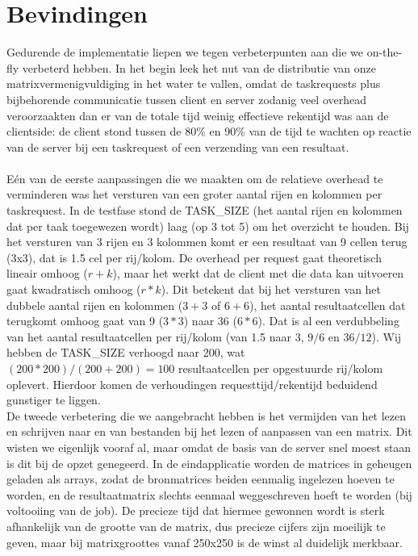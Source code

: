 \documentclass[11pt]{article}
\begin{document}
\section{Bevindingen}
Gedurende de implementatie liepen we tegen verbeterpunten aan die we on-the-fly verbeterd hebben.
In het begin leek het nut van de distributie van onze matrixvermenigvuldiging in het water te
vallen, omdat de taskrequests plus bijbehorende communicatie tussen client en server zodanig
veel overhead veroorzaakten dan er van de totale tijd weinig effectieve rekentijd was aan de 
clientside: de client stond tussen de 80\% en 90\% van de tijd te wachten op reactie van de
server bij een taskrequest of een verzending van een resultaat.\\
\\
E\'{e}n van de eerste aanpassingen die we maakten om de relatieve overhead te verminderen was
het versturen van een groter aantal rijen en kolommen per taskrequest. In de testfase stond de
TASK\_SIZE (het aantal rijen en kolommen dat per taak toegewezen wordt) laag (op 3 tot 5) om het
overzicht te houden. Bij het versturen van 3 rijen en 3 kolommen komt er een resultaat van 9 cellen
terug (3x3), dat is 1.5 cel per rij/kolom. De overhead per request gaat theoretisch lineair omhoog
($r + k$), maar het werkt dat de client met die data kan uitvoeren gaat kwadratisch omhoog ($r * k$).
Dit betekent dat bij het versturen van het dubbele aantal rijen en kolommen ($3 + 3$ of $6 + 6$), het
aantal resultaatcellen dat terugkomt omhoog gaat van 9 ($3 * 3$) naar 36 ($6 * 6$). Dat is al een
verdubbeling van het aantal resultaatcellen per rij/kolom (van 1.5 naar 3, $9/6$ en $36/12$). Wij
hebben de TASK\_SIZE verhoogd naar 200, wat $(200*200)/(200+200) = 100$ resultaatcellen per
opgestuurde rij/kolom oplevert. Hierdoor komen de verhoudingen requesttijd/rekentijd beduidend
gunstiger te liggen.\\
De tweede verbetering die we aangebracht hebben is het vermijden van het lezen en schrijven
naar en van bestanden bij het lezen of aanpassen van een matrix. Dit wisten we eigenlijk vooraf
al, maar omdat de basis van de server snel moest staan is dit bij de opzet genegeerd. In de
eindapplicatie worden de matrices in geheugen geladen als arrays, zodat de bronmatrices beiden
eenmalig ingelezen hoeven te worden, en de resultaatmatrix slechts eenmaal weggeschreven hoeft
te worden (bij voltooiing van de job). De precieze tijd dat hiermee gewonnen wordt is sterk
afhankelijk van de grootte van de matrix, dus precieze cijfers zijn moeilijk te geven, maar bij
matrixgroottes vanaf 250x250 is de winst al duidelijk merkbaar.
\end{document}
